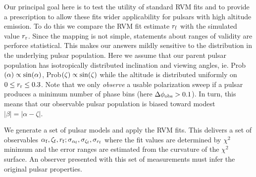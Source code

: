 	Our principal goal here is to test the utility of standard RVM fits and
to provide a prescription to allow these fits wider applicability for pulsars
with high altitude emission. To do this we compare the RVM fit estimate $r_{\rm{f}}$ with
the simulated value $r_{\rm{r}}$. Since the mapping is not simple, statements about
ranges of validity are perforce statistical. This makes our answers mildly
sensitive to the distribution in the underlying pulsar population. Here
we assume that our parent 
pulsar population has isotropically distributed inclination and viewing angles,
ie. Prob$(\alpha)\propto {\rm sin}(\alpha)$, Prob$(\zeta) \propto {\rm sin}(\zeta)$
while the altitude is distributed uniformly on $0\le r_{\rm{r}}\le 0.3$. Note that we
only {\it observe} a usable polarization sweep if a pulsar produces a minimum
number of phase bins (here $\Delta \phi_{\rm{obs}}>0.1$). In turn,
this means that our observable pulsar population is biased toward modest
$|\beta| = |\alpha-\zeta|$.

	We generate a set of pulsar models and apply the RVM fits. This delivers
a set of observables ${\alpha_{\rm{f}}, \zeta_{\rm{f}}, r_{\rm{f}}; \sigma_{\alpha_{\rm{f}}}, \sigma_{\zeta_{\rm{f}}}, \sigma_{r_{\rm{f}}}}$
where the fit values are determined by $\chi^2$ minimum and the error ranges
are estimated from the curvature of the $\chi^2$ surface. An observer presented
with this set of measurements must infer the original pulsar properties.

